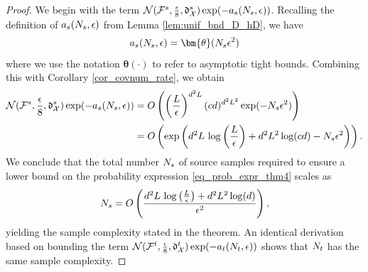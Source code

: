 \documentclass[review,supplement,onefignum,onetabnum]{siamonline250211}
\begin{document}
\begin{proof}
We begin with the term 
$\mathcal{N}(\mathcal{F}^s, \frac{\epsilon}{8}, \mathfrak{d}^s_{\mathcal{X}} ) \exp(-a_s(N_s, \epsilon)) $. Recalling the definition of  $a_s(N_s, \epsilon)$ from Lemma \ref{lem:unif_bnd_D_hD}, we have
\begin{equation*}
\begin{split}
\as(\Ns, \epsilon) = \bm{\theta}(\Ns \epsilon^2)
\end{split}
\end{equation*}
%
where we use the notation $\bm{\theta}(\cdot)$ to refer to asymptotic tight bounds. Combining this with Corollary \ref{cor_covnum_rate}, we obtain 
\begin{equation*}
\begin{split}
\mathcal{N}(\mathcal{F}^s, \frac{\epsilon}{8}, \mathfrak{d}^s_{\mathcal{X}} ) \exp(-a_s(N_s, \epsilon)) 
&=
O\left( 
\left( \frac{  L }{\epsilon}  \right)^{{d}^2 L}   (c {d})^{{d}^2 L^2} 
\exp(- N_s \epsilon^2)
\right) \\
&=O\left(
\exp \left(
{d}^2 L \, \log\left( \frac{  L }{\epsilon}  \right)
+ 
{d}^2 L^2 \log(c {d}) 
- 
N_s \epsilon^2
\right)
\right).
\end{split}
\end{equation*}
%
We conclude that the total number $N_s$ of source samples required to ensure a lower bound on the probability expression \eqref{eq_prob_expr_thm4} scales as
%
\begin{equation*}
\begin{split}
N_s = O \left(
\frac{{d}^2 L \, \log\left( \frac{  L }{\epsilon}  \right)
+ 
{d}^2 L^2 \log({d}) }
{\epsilon^2}
\right),
\end{split}
\end{equation*}
%
yielding the sample complexity stated in the theorem. An identical derivation based on bounding the term $ \mathcal{N}(\mathcal{F}^t, \frac{\epsilon}{8}, \mathfrak{d}^t_{\mathcal{X}} ) \exp(-a_t(N_t, \epsilon))$ shows that $N_t $ has the same sample complexity.


\end{proof}
\end{document}
